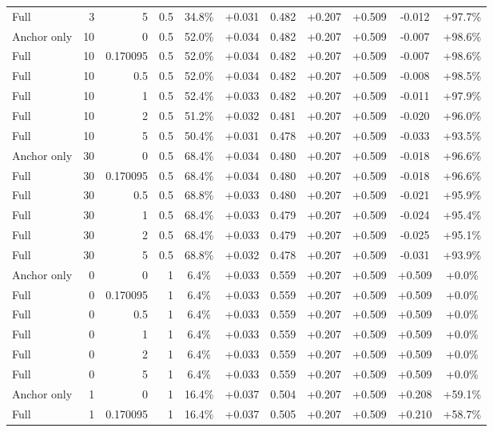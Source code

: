 \begin{table}[htbp]
\begin{tabular}{lrrrccccccc}
Full & 3 & 5 & 0.5 & 34.8\% & +0.031 & 0.482 & +0.207 & +0.509 & -0.012 & +97.7\% \\
Anchor only & 10 & 0 & 0.5 & 52.0\% & +0.034 & 0.482 & +0.207 & +0.509 & -0.007 & +98.6\% \\
Full & 10 & 0.170095 & 0.5 & 52.0\% & +0.034 & 0.482 & +0.207 & +0.509 & -0.007 & +98.6\% \\
Full & 10 & 0.5 & 0.5 & 52.0\% & +0.034 & 0.482 & +0.207 & +0.509 & -0.008 & +98.5\% \\
Full & 10 & 1 & 0.5 & 52.4\% & +0.033 & 0.482 & +0.207 & +0.509 & -0.011 & +97.9\% \\
Full & 10 & 2 & 0.5 & 51.2\% & +0.032 & 0.481 & +0.207 & +0.509 & -0.020 & +96.0\% \\
Full & 10 & 5 & 0.5 & 50.4\% & +0.031 & 0.478 & +0.207 & +0.509 & -0.033 & +93.5\% \\
Anchor only & 30 & 0 & 0.5 & 68.4\% & +0.034 & 0.480 & +0.207 & +0.509 & -0.018 & +96.6\% \\
Full & 30 & 0.170095 & 0.5 & 68.4\% & +0.034 & 0.480 & +0.207 & +0.509 & -0.018 & +96.6\% \\
Full & 30 & 0.5 & 0.5 & 68.8\% & +0.033 & 0.480 & +0.207 & +0.509 & -0.021 & +95.9\% \\
Full & 30 & 1 & 0.5 & 68.4\% & +0.033 & 0.479 & +0.207 & +0.509 & -0.024 & +95.4\% \\
Full & 30 & 2 & 0.5 & 68.4\% & +0.033 & 0.479 & +0.207 & +0.509 & -0.025 & +95.1\% \\
Full & 30 & 5 & 0.5 & 68.8\% & +0.032 & 0.478 & +0.207 & +0.509 & -0.031 & +93.9\% \\
Anchor only & 0 & 0 & 1 & 6.4\% & +0.033 & 0.559 & +0.207 & +0.509 & +0.509 & +0.0\% \\
Full & 0 & 0.170095 & 1 & 6.4\% & +0.033 & 0.559 & +0.207 & +0.509 & +0.509 & +0.0\% \\
Full & 0 & 0.5 & 1 & 6.4\% & +0.033 & 0.559 & +0.207 & +0.509 & +0.509 & +0.0\% \\
Full & 0 & 1 & 1 & 6.4\% & +0.033 & 0.559 & +0.207 & +0.509 & +0.509 & +0.0\% \\
Full & 0 & 2 & 1 & 6.4\% & +0.033 & 0.559 & +0.207 & +0.509 & +0.509 & +0.0\% \\
Full & 0 & 5 & 1 & 6.4\% & +0.033 & 0.559 & +0.207 & +0.509 & +0.509 & +0.0\% \\
Anchor only & 1 & 0 & 1 & 16.4\% & +0.037 & 0.504 & +0.207 & +0.509 & +0.208 & +59.1\% \\
Full & 1 & 0.170095 & 1 & 16.4\% & +0.037 & 0.505 & +0.207 & +0.509 & +0.210 & +58.7\% \\

\end{tabular}
\end{table}
